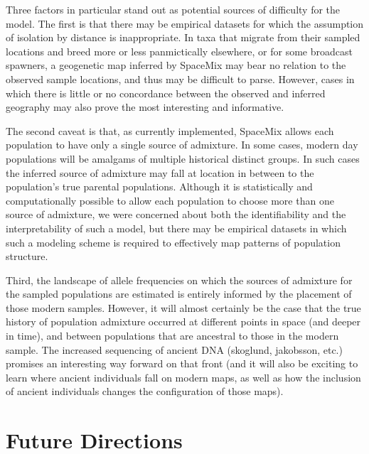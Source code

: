 \documentclass[12pt]{article}
\begin{document}
Three factors in particular stand out as potential sources of difficulty for the model.  The first is that there may be empirical datasets for which the assumption of isolation by distance is inappropriate.  In taxa that migrate from their sampled locations and breed more or less panmictically elsewhere,
or for some broadcast spawners, 
a geogenetic map inferred by SpaceMix may bear no relation to the observed sample locations, and thus may be difficult to parse.  However, cases in which there is little or no concordance between the observed and inferred geography may also prove the most interesting and informative.

The second caveat is that, as currently implemented, SpaceMix allows each population to have only a single source of admixture.  In some cases, modern day populations will be amalgams of multiple historical distinct groups. In such cases  the inferred source of admixture may fall at location in between to the population's true parental populations.  Although it is statistically and computationally possible to allow each population to choose more than one source of admixture, we were concerned about both the identifiability and the interpretability of such a model, but there may be empirical datasets in which such a modeling scheme is required to effectively map patterns of population structure.

Third, the landscape of allele frequencies on which the sources of admixture for the sampled populations are estimated is entirely informed by the placement of those modern samples.  However, it will almost certainly be the case that the true history of population admixture occurred at different points in space (and deeper in time), and between populations that are ancestral to those in the modern sample.  The increased sequencing of ancient DNA (skoglund, jakobsson, etc.) promises an interesting way forward on that front (and it will also be exciting to learn where ancient individuals fall on modern maps, as well as how the inclusion of ancient individuals changes the configuration of those maps).

\section*{Future Directions}
\end{document}
